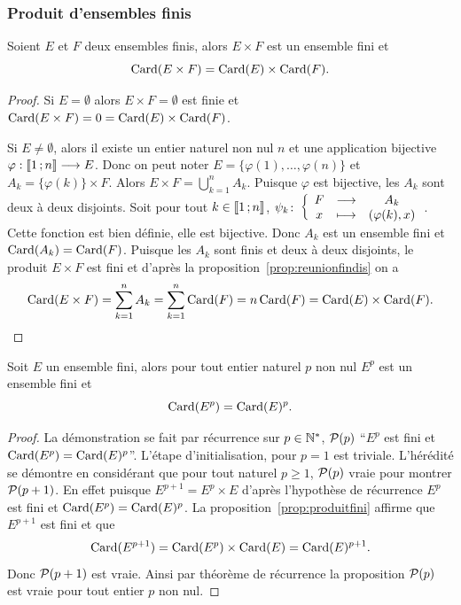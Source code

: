 \subsubsection{Produit d'ensembles finis}

\begin{prop}
  \label{prop:produitfini}
  Soient \(E\) et \(F\) deux ensembles finis, alors \(E\times F\) est un 
  ensemble fini et
  \begin{equation}
    \Card(E\times F) = \Card(E)\times \Card(F).
  \end{equation}
\end{prop}

\begin{proof}
  Si \(E = \emptyset\) alors \(E\times F = \emptyset\) est finie et 
  \(\Card(E\times F) = 0 = \Card(E)\times \Card(F)\).

  Si \(E\neq\emptyset\), alors il existe un entier naturel non nul \(n\) et une 
  application bijective \(\fonctionR{\varphi}{\intervalleentier{1}{n}}{E}\). 
  Donc on peut noter \(E = \{\varphi(1),\ldots ,\varphi(n)\}\) et \(A_k = 
  \{\varphi(k)\}\times F\). Alors \(E\times F = \bigcup_{k = 1}^n A_k\).  
  Puisque \(\varphi\) est bijective, les \(A_k\) sont deux à deux disjoints.  
  Soit pour tout \(k\in\intervalleentier{1}{n}\), 
  \(\fonction{\psi_k}{F}{A_k}{x}{(\varphi(k),x)}\). Cette fonction est bien 
  définie, elle est bijective. Donc \(A_k\) est un ensemble fini et \(\Card(A_k) 
  = \Card(F)\). Puisque les \(A_k\) sont finis et deux à deux disjoints, le 
  produit \(E\times F\) est fini et d'après la 
  proposition~\ref{prop:reunionfindis} on a
  \begin{equation}
    \Card(E\times F) = \sum_{k = 1}^{n} A_k = \sum_{k = 1}^{n}\Card(F) = 
    n\Card(F) = \Card(E)\times \Card(F).
  \end{equation}
\end{proof}

\begin{prop}
  Soit \(E\) un ensemble fini, alors pour tout entier naturel \(p\) non nul 
  \(E^p\) est un ensemble fini et
  \begin{equation}
    \Card(E^p) = \Card(E)^p.
  \end{equation}
\end{prop}

\begin{proof}
  La démonstration se fait par récurrence sur \(p\in\N^*\), \(\P(p)\) ``\(E^p\) 
  est fini et \(\Card(E^p) = \Card(E)^p\)''. L'étape d'initialisation, pour \(p 
  = 1\) est triviale. L'hérédité se démontre en considérant que pour tout 
  naturel \(p\geqslant 1\), \(\P(p)\) vraie pour montrer \(\P(p + 1)\). En effet 
  puisque \(E^{p + 1} = E^p \times E\) d'après l'hypothèse de récurrence \(E^p\) 
  est fini et \(\Card(E^p) = \Card(E)^p\). La proposition~\ref{prop:produitfini} 
  affirme que \(E^{p + 1}\) est fini et que
  \begin{equation}
    \Card(E^{p + 1}) = \Card(E^p)\times \Card(E) = \Card(E)^{p + 1}.
  \end{equation}
  Donc \(\P(p + 1)\) est vraie. Ainsi par théorème de récurrence la proposition 
  \(\P(p)\) est vraie pour tout entier \(p\) non nul.
\end{proof}

